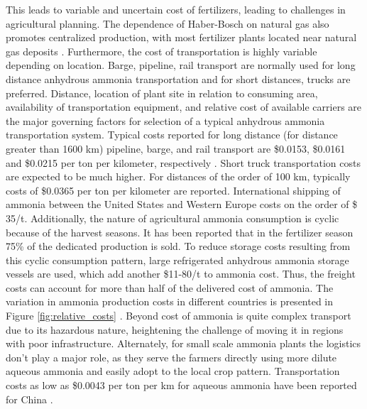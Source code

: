 This leads to variable and uncertain cost of fertilizers, leading to challenges in agricultural planning\cite{Etienne2016}. The dependence of Haber-Bosch on natural gas also promotes centralized production, with most fertilizer plants located near natural gas deposits \cite{McArthur_2017}. Furthermore, the cost of transportation is highly variable depending on location. Barge, pipeline, rail transport are normally used for long distance anhydrous ammonia transportation and for short distances, trucks are preferred. Distance, location of plant site in relation to consuming area, availability of transportation equipment, and relative cost of available carriers are the major governing factors for selection of a typical anhydrous ammonia transportation system. Typical costs reported for long distance (for distance greater than 1600 km) pipeline, barge, and rail transport are \$0.0153, \$0.0161 and \$0.0215 per ton per kilometer, respectively \cite{ammonia_encyclopedia}.  Short truck transportation costs are expected to be much higher. For distances of the order of 100 km, typically costs of \$0.0365 per ton per kilometer are reported. International shipping of ammonia between the United States and Western Europe costs on the order of \$ 35/t. Additionally, the nature of agricultural ammonia consumption is cyclic because of the harvest seasons. It has been reported that in the fertilizer season 75\% of the dedicated production is sold. To reduce storage costs resulting from this cyclic consumption pattern, large refrigerated anhydrous ammonia storage vessels are used, which add another \$11-80/t to ammonia cost\cite{IFDC_1998,ammonia_encyclopedia}. Thus, the freight costs can account for more than half of the delivered cost of ammonia. The variation in ammonia production costs in different countries is presented in Figure \ref{fig:relative_costs} \cite{maxwell2004synthetic}. Beyond cost of ammonia is quite complex transport due to its hazardous nature, heightening the challenge of moving it in regions with poor infrastructure\cite{Etienne2016}. Alternately, for small scale ammonia plants the logistics don’t play a major role, as they serve the farmers directly using more dilute aqueous ammonia and easily adopt to the local crop pattern\cite{IFDC_1998}. Transportation costs as low as \$0.0043 per ton per km for aqueous ammonia have been reported for China \cite{guo2002animal}.

